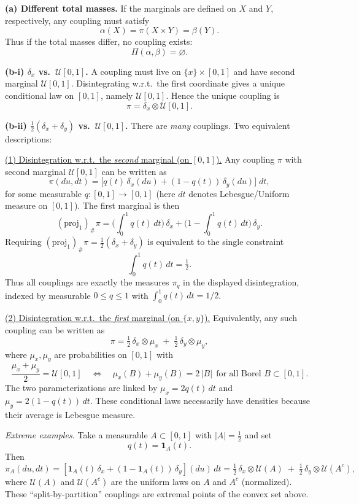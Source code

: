 \documentclass[11pt,a4paper]{article}
\theoremstyle{exostyle}
\newcommand{\Unif}{\mathcal U}
\begin{document}
\begin{solution}
\textbf{(a) Different total masses.}
If the marginals are defined on $X$ and $Y$, respectively, any coupling must satisfy
\[
\alpha(X)=\pi(X\times Y)=\beta(Y).
\]
Thus if the total masses differ, no coupling exists:
\[
\Pi(\alpha,\beta)=\varnothing.
\]

\medskip
\textbf{(b-i) $\delta_x$ vs.\ $\Unif[0,1]$.}
A coupling must live on $\{x\}\times[0,1]$ and have second marginal $\Unif[0,1]$.
Disintegrating w.r.t.\ the first coordinate gives a unique conditional law on $[0,1]$, namely $\Unif[0,1]$. Hence the unique coupling is
\[
\pi=\delta_x\otimes \Unif[0,1].
\]

\smallskip
\textbf{(b-ii) $\tfrac12(\delta_x+\delta_y)$ vs.\ $\Unif[0,1]$.}
There are \emph{many} couplings. Two equivalent descriptions:

\underline{(1) Disintegration w.r.t.\ the \emph{second} marginal (on $[0,1]$).}
Any coupling $\pi$ with second marginal $\Unif[0,1]$ can be written as
\[
\pi(du,dt)=\big[q(t)\,\delta_x(du)+(1-q(t))\,\delta_y(du)\big]\;dt,
\]
for some measurable $q:[0,1]\to[0,1]$ (here $dt$ denotes Lebesgue/Uniform measure on $[0,1]$).
The first marginal is then
\[
(\mathrm{proj}_1)_\#\pi=\Big(\int_0^1 q(t)\,dt\Big)\,\delta_x+\Big(1-\int_0^1 q(t)\,dt\Big)\,\delta_y.
\]
Requiring $(\mathrm{proj}_1)_\#\pi=\tfrac12(\delta_x+\delta_y)$ is equivalent to the single constraint
\[
\int_0^1 q(t)\,dt=\tfrac12.
\]
Thus all couplings are exactly the measures $\pi_q$ in the displayed
disintegration, indexed by measurable $0\le q\le1$ with $\int_0^1q(t)\,dt=1/2$.

\underline{(2) Disintegration w.r.t.\ the \emph{first} marginal (on $\{x,y\}$).}
Equivalently, any such coupling can be written as
\[
\pi=\tfrac12\,\delta_x\otimes \mu_x\;+\;\tfrac12\,\delta_y\otimes \mu_y,
\]
where $\mu_x,\mu_y$ are probabilities on $[0,1]$ with
\[
\frac{\mu_x+\mu_y}{2}=\Unif[0,1]\quad\Longleftrightarrow\quad
\mu_x(B)+\mu_y(B)=2\,|B|\ \ \text{for all Borel }B\subset[0,1].
\]
The two parameterizations are linked by $\mu_x=2q(t)\,dt$ and $\mu_y=2(1-q(t))\,dt$. These conditional laws necessarily have densities because their average is Lebesgue measure.

\emph{Extreme examples.}
Take a measurable $A\subset[0,1]$ with $|A|=\tfrac12$ and set
\[
q(t)=\mathbf 1_{A}(t).
\]
Then
\[
\pi_A(du,dt)=[\mathbf 1_A(t)\,\delta_x+(1-\mathbf 1_A(t))\,\delta_y](du)\,dt
= \tfrac12\,\delta_x\otimes \Unif(A)\;+\;\tfrac12\,\delta_y\otimes \Unif(A^c),
\]
where $\Unif(A)$ and $\Unif(A^c)$ are the uniform laws on $A$ and $A^c$ (normalized).
These ``split-by-partition'' couplings are extremal points of the convex set above.
\end{solution}
\end{document}
